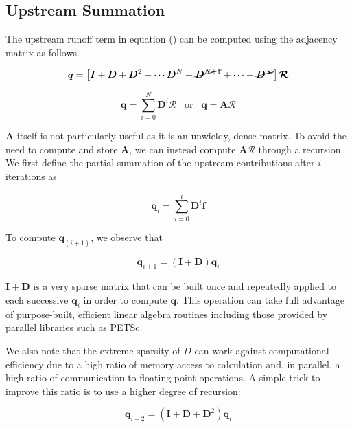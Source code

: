 \documentclass[draft,jgrga]{agu_template/AGUTeX}
\begin{document}
\subsection{Upstream Summation}

The upstream runoff term in equation () can be computed using the adjacency matrix as follows. 

\begin{equation}
    \bm{q} = \left[ \bm{I} + 
                    \bm{D} + 
                    \bm{D}^2 + \cdots
                    \bm{D}^N + 
                    \cancel{\bm{D}^{N+1}} + \cdots +
                    \cancel{\bm{D}^{\infty}}  
                    \right] \bm{\mathcal R} 
\end{equation}
 
\begin{equation}
            \bm{q} = 
                    \sum_{i=0}^{N} \bm{D}^i \bm{\mathcal R}  \;\;\; \textrm{or} \;\;\; 
    \bm{q} = \bm{A} \bm{\mathcal R}
\end{equation}

$\bm{A}$ itself is not particularly useful as it is an unwieldy, dense matrix. To avoid the need to compute and store $\bm{A}$, we can instead compute $\bm{A} \bm{\mathcal R}$ through a recursion. We first define the partial summation of the upstream contributions after $i$ iterations as 

\begin{equation}
     \bm{q}_i = \sum_{i=0}^{i} \bm{D}^i \bm{f} 
\end{equation}

To compute $\bm{q}_(i+1)$, we observe that 

\begin{equation}
     \bm{q}_{i+1} = (\bm{I} + \bm{D}) \bm{q}_i
\end{equation}

$\bm{I}+\bm{D}$ is a very sparse matrix that can be built once and repeatedly applied to each successive $ \bm{q}_i$ in order to compute $\bm{q}$. This operation can take full advantage of purpose-built, efficient linear algebra routines including those provided by parallel libraries such as PETSc. 

We also note that the extreme sparsity of $D$ can work against computational efficiency due to a high ratio of memory access to calculation and, in parallel, a high ratio of communication to floating point operations. A simple trick to improve this ratio is to use a higher degree of recursion:

\begin{equation}
    \bm{q}_{i+2} = (    \bm{I} + 
                        \bm{D} + 
                        \bm{D}^2 )
                                \bm{q}_i
\end{equation}
\end{document}
